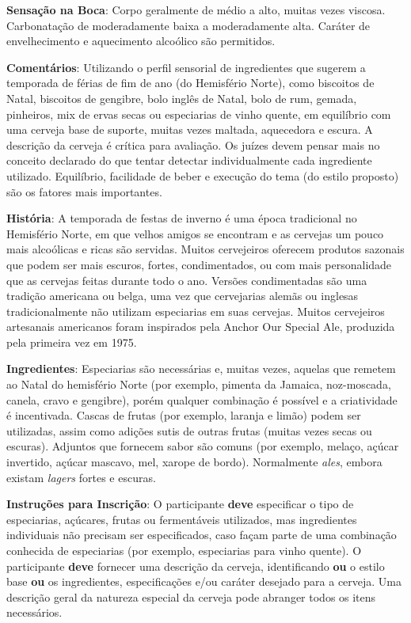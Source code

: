 \textbf{Sensação na Boca}: Corpo geralmente de médio a alto, muitas vezes viscosa. Carbonatação de moderadamente baixa a moderadamente alta. Caráter de envelhecimento e aquecimento alcoólico são permitidos.

\textbf{Comentários}: Utilizando o perfil sensorial de ingredientes que sugerem a temporada de férias de fim de ano (do Hemisfério Norte), como biscoitos de Natal, biscoitos de gengibre, bolo inglês de Natal, bolo de rum, gemada, pinheiros, mix de ervas secas ou especiarias de vinho quente, em equilíbrio com uma cerveja base de suporte, muitas vezes maltada, aquecedora e escura. A descrição da cerveja é crítica para avaliação. Os juízes devem pensar mais no conceito declarado do que tentar detectar individualmente cada ingrediente utilizado. Equilíbrio, facilidade de beber e execução do tema (do estilo proposto) são os fatores mais importantes.

\textbf{História}: A temporada de festas de inverno é uma época tradicional no Hemisfério Norte, em que velhos amigos se encontram e as cervejas um pouco mais alcoólicas e ricas são servidas. Muitos cervejeiros oferecem produtos sazonais que podem ser mais escuros, fortes, condimentados, ou com mais personalidade que as cervejas feitas durante todo o ano. Versões condimentadas são uma tradição americana ou belga, uma vez que cervejarias alemãs ou inglesas tradicionalmente não utilizam especiarias em suas cervejas. Muitos cervejeiros artesanais americanos foram inspirados pela Anchor Our Special Ale, produzida pela primeira vez em 1975.

\textbf{Ingredientes}: Especiarias são necessárias e, muitas vezes, aquelas que remetem ao Natal do hemisfério Norte (por exemplo, pimenta da Jamaica, noz-moscada, canela, cravo e gengibre), porém qualquer combinação é possível e a criatividade é incentivada. Cascas de frutas (por exemplo, laranja e limão) podem ser utilizadas, assim como adições sutis de outras frutas (muitas vezes secas ou escuras). Adjuntos que fornecem sabor são comuns (por exemplo, melaço, açúcar invertido, açúcar mascavo, mel, xarope de bordo). Normalmente \textit{ales}, embora existam \textit{lagers} fortes e escuras.

\textbf{Instruções para Inscrição}: O participante \textbf{deve} especificar o tipo de especiarias, açúcares, frutas ou fermentáveis utilizados, mas ingredientes individuais não precisam ser especificados, caso façam parte de uma combinação conhecida de especiarias (por exemplo, especiarias para vinho quente). O participante \textbf{deve} fornecer uma descrição da cerveja, identificando \textbf{ou} o estilo base \textbf{ou} os ingredientes, especificações e/ou caráter desejado para a cerveja. Uma descrição geral da natureza especial da cerveja pode abranger todos os itens necessários.

